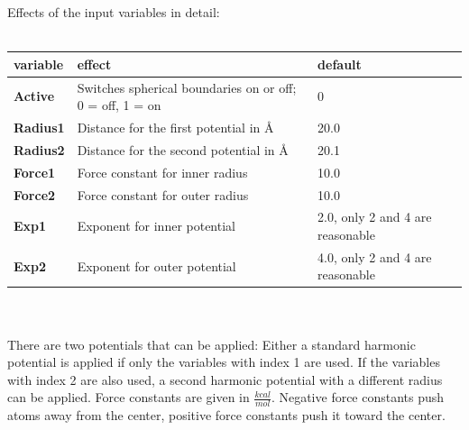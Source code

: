 \documentclass[10pt,a4paper]{article} %
\begin{document}
	Effects of the input variables in detail:\\~\\
	\begin{tabularx}{\textwidth}{l|X|X}
		\textbf{variable} & effect & default \\
		\hline
		\textbf{Active} & Switches spherical boundaries on or off; 0 = off, 1 = on & 0 \\
		\textbf{Radius1} & Distance for the first potential in Å & 20.0 \\
		\textbf{Radius2} & Distance for the second potential in Å & 20.1 \\
		\textbf{Force1} & Force constant for inner radius & 10.0 \\
		\textbf{Force2} & Force constant for outer radius & 10.0 \\
		\textbf{Exp1} & Exponent for inner potential & 2.0, only 2 and 4 are reasonable \\
		\textbf{Exp2} & Exponent for outer potential & 4.0, only 2 and 4 are reasonable \\
	\end{tabularx}~\\~\\
	There are two potentials that can be applied: Either a standard harmonic potential is applied if only the variables with index 1 are used. If the variables with index 2 are also used, a second harmonic potential with a different radius can be applied.
	Force constants are given in $\frac{kcal}{mol}$. Negative force constants push atoms away from the center, positive force constants push it toward the center.
	
\end{document}
